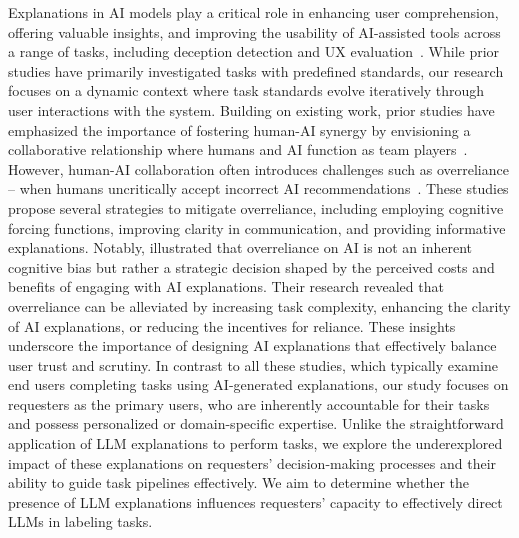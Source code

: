Explanations in AI models play a critical role in enhancing user comprehension, offering valuable insights, and improving the usability of AI-assisted tools across a range of tasks, including deception detection and UX evaluation~\cite{lai2019human, fan2022human}. While prior studies have primarily investigated tasks with predefined standards, our research focuses on a dynamic context where task standards evolve iteratively through user interactions with the system.
Building on existing work, prior studies have emphasized the importance of fostering human-AI synergy by envisioning a collaborative relationship where humans and AI function as team players~\cite{lai2020chicago,fan2022human}.
However, human-AI collaboration often introduces challenges such as overreliance -- when humans uncritically accept incorrect AI recommendations~\cite{passi2022overreliance, buccinca2021trust}. These studies propose several strategies to mitigate overreliance, including employing cognitive forcing functions, improving clarity in communication, and providing informative explanations.
Notably, \citet{vasconcelos2023explanations} illustrated that overreliance on AI is not an inherent cognitive bias but rather a strategic decision shaped by the perceived costs and benefits of engaging with AI explanations. Their research revealed that overreliance can be alleviated by increasing task complexity, enhancing the clarity of AI explanations, or reducing the incentives for reliance.
These insights underscore the importance of designing AI explanations that effectively balance user trust and scrutiny.
In contrast to all these studies, which typically examine end users completing tasks using AI-generated explanations, our study focuses on requesters as the primary users, who are inherently accountable for their tasks and possess personalized or domain-specific expertise. 
Unlike the straightforward application of LLM explanations to perform tasks, we explore the underexplored impact of these explanations on requesters' decision-making processes and their ability to guide task pipelines effectively. 
We aim to determine whether the presence of LLM explanations influences requesters’ capacity to effectively direct LLMs in labeling tasks.


